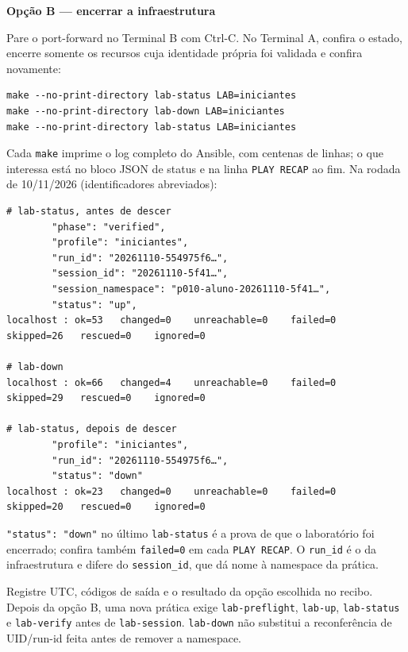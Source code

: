 \documentclass[12pt,openany,oneside,a4paper,chapter=TITLE,english,brazil]{abntex2}
\begin{document}
\textbf{Opção B --- encerrar a infraestrutura}

Pare o port-forward no Terminal B com Ctrl-C. No Terminal A, confira o estado, encerre somente os recursos cuja identidade própria foi validada e confira novamente:

\begin{verbatim}
make --no-print-directory lab-status LAB=iniciantes
make --no-print-directory lab-down LAB=iniciantes
make --no-print-directory lab-status LAB=iniciantes
\end{verbatim}

Cada \texttt{make} imprime o log completo do Ansible, com centenas de linhas; o que interessa está no bloco JSON de status e na linha \texttt{PLAY RECAP} ao fim. Na rodada de 10/11/2026 (identificadores abreviados):

\begin{verbatim}
# lab-status, antes de descer
        "phase": "verified",
        "profile": "iniciantes",
        "run_id": "20261110-554975f6…",
        "session_id": "20261110-5f41…",
        "session_namespace": "p010-aluno-20261110-5f41…",
        "status": "up",
localhost : ok=53   changed=0    unreachable=0    failed=0    skipped=26   rescued=0    ignored=0

# lab-down
localhost : ok=66   changed=4    unreachable=0    failed=0    skipped=29   rescued=0    ignored=0

# lab-status, depois de descer
        "profile": "iniciantes",
        "run_id": "20261110-554975f6…",
        "status": "down"
localhost : ok=23   changed=0    unreachable=0    failed=0    skipped=20   rescued=0    ignored=0
\end{verbatim}

\texttt{"status":\allowbreak{} "down"} no último \texttt{lab-{}\allowbreak{}status} é a prova de que o laboratório foi encerrado; confira também \texttt{failed=\allowbreak{}0} em cada \texttt{PLAY RECAP}. O \texttt{run\_\allowbreak{}id} é o da infraestrutura e difere do \texttt{session\_\allowbreak{}id}, que dá nome à namespace da prática.

Registre UTC, códigos de saída e o resultado da opção escolhida no recibo. Depois da opção B, uma nova prática exige \texttt{lab-{}\allowbreak{}preflight}, \texttt{lab-{}\allowbreak{}up}, \texttt{lab-{}\allowbreak{}status} e \texttt{lab-{}\allowbreak{}verify} antes de \texttt{lab-{}\allowbreak{}session}. \texttt{lab-{}\allowbreak{}down} não substitui a reconferência de UID/run-id feita antes de remover a namespace.
\end{document}
